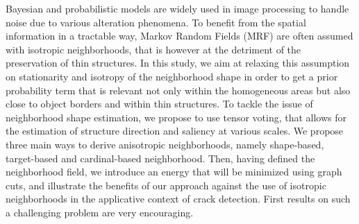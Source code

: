 Bayesian and probabilistic models are widely used in image processing to handle noise due to various alteration phenomena. To benefit from the spatial information in a tractable way, Markov Random Fields (MRF) are often assumed with isotropic neighborhoods, that is however at the
detriment of the preservation of thin structures. In this study, we aim at relaxing this assumption on stationarity and isotropy of the neighborhood shape in order to get a prior probability term that is relevant not only within the homogeneous areas but also close to object borders and within thin structures. To tackle the issue of neighborhood shape estimation, we propose to use tensor voting, that allows for the estimation of structure direction and saliency at various scales. We propose three main ways to derive anisotropic neighborhoods, namely shape-based, target-based and cardinal-based neighborhood. Then, having defined the neighborhood field, we introduce an
energy that will be minimized using graph cuts, and illustrate the benefits of our approach against the use of isotropic neighborhoods in the applicative context of crack detection. First results on such a challenging problem are very encouraging.

